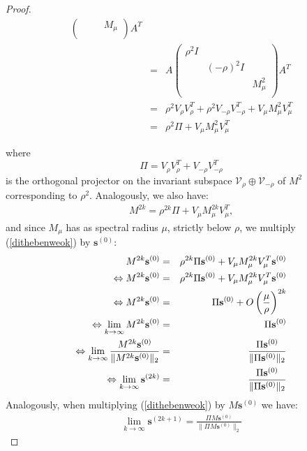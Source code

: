 \documentclass[a4paper,11pt]{report}
\begin{document}
\begin{proof}
\begin{eqnarray*}
\begin{pmatrix}
\; & \; & M_\mu \\
\end{pmatrix}A^T\\
&=& A \begin{pmatrix}
\rho^2 I & \; & \; \\
\; & (-\rho)^2 I & \;\\
\; & \; & M^2_\mu \\
\end{pmatrix}A^T\\
&=& \rho^2 V_\rho V^T_\rho + \rho^2 V_{-\rho}V^T_{-\rho} + V_{\mu}M^2_{\mu}V_{\mu}^T\\
   &=& \rho^2 \Pi + V_\mu M^2_\mu V_\mu^T
\end{eqnarray*}

where
$$\Pi = V_\rho V_\rho^T + V_{-\rho}V_{-\rho}^T$$
 is the orthogonal projector on the invariant subspace $\mathcal{V}_\rho \oplus \mathcal{V}_{-\rho}$
 of $M^2$ corresponding to $\rho^2$. Analogously, we also have:
 \begin{eqnarray}\label{dithebenweok}
  M^{2k} = \rho^{2k}\Pi + V_\mu M^{2k}_\mu V_\mu^T,
\end{eqnarray}
 and since $M_\mu$ has as spectral radius $\mu$, strictly below $\rho$, we multiply (\ref{dithebenweok}) by 
 $\mathbf{s}^{(0)}$:
 \allowdisplaybreaks
 \begin{eqnarray}
   M^{2k}\mathbf{s}^{(0)} &=& \rho^{2k}\Pi\mathbf{s}^{(0)} + V_\mu M^{2k}_\mu 
   V_\mu^T\mathbf{s}^{(0)} \notag\\
  \Leftrightarrow M^{2k}\mathbf{s}^{(0)}  &=&\rho^{2k}\Pi\mathbf{s}^{(0)} + V_\mu M^{2k}_\mu  V_\mu^T\mathbf{s}^{(0)}\notag\\
  \Leftrightarrow M^{2k}\mathbf{s}^{(0)}  &=& \Pi\mathbf{s}^{(0)}  + O\left(\frac{\mu}{\rho}\right)^{2k} \label{vergeejkjfqk}\\
\Leftrightarrow \lim_{k \to \infty} M^{2k}\mathbf{s}^{(0)}  &=& 
\Pi\mathbf{s}^{(0)}\notag\\
\Leftrightarrow \lim_{k \to \infty} \frac{M^{2k}\mathbf{s}^{(0)}}{\|M^{2k}\mathbf{s}^{(0)}\|_2}  &=& 
\frac{\Pi\mathbf{s}^{(0)}}{\|\Pi\mathbf{s}^{(0)}\|_2}\notag\\
\Leftrightarrow  \lim_{k \to \infty} \mathbf{s}^{(2k)}  &=& 
\frac{\Pi\mathbf{s}^{(0)}}{\|\Pi\mathbf{s}^{(0)}\|_2}\label{gat1}
\end{eqnarray}
Analogously, when multiplying (\ref{dithebenweok}) by $M\mathbf{s}^{(0)}$ we 
have:
 \begin{eqnarray}
 \lim_{k \to \infty} \mathbf{s}^{(2k+1)} = \frac{\Pi M \mathbf{s}^{(0)}}{\|\Pi M \mathbf{s}^{(0)}\|_2}\label{gat2}

\end{eqnarray}
\end{proof}
\end{document}
